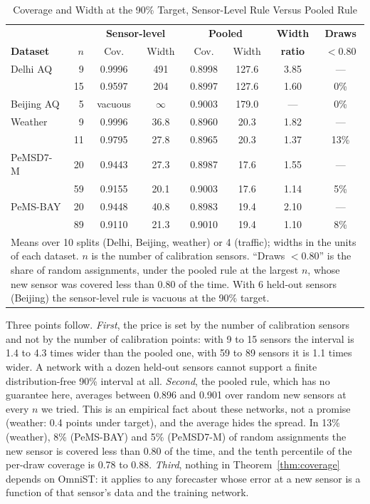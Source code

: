 \documentclass[journal,twoside,web]{ieeecolor}
\begin{document}
\begin{table}[htbp]
\caption{Coverage and Width at the 90\% Target, Sensor-Level Rule Versus Pooled Rule}
\label{tab:bound}
\centering
\footnotesize
\setlength{\tabcolsep}{3pt}
\begin{tabular}{lrcccccc}
\toprule
 & & \multicolumn{2}{c}{\textbf{Sensor-level}} & \multicolumn{2}{c}{\textbf{Pooled}} & \textbf{Width} & \textbf{Draws} \\
\textbf{Dataset} & $n$ & Cov. & Width & Cov. & Width & \textbf{ratio} & \textbf{$<0.80$} \\
\midrule
Delhi AQ   &  9 & 0.9996 & 491 & 0.8998 & 127.6 & 3.85 & --- \\
           & 15 & 0.9597 & 204 & 0.8997 & 127.6 & 1.60 & 0\% \\
Beijing AQ &  5 & vacuous & $\infty$ & 0.9003 & 179.0 & --- & 0\% \\
Weather    &  9 & 0.9996 & 36.8 & 0.8960 & 20.3 & 1.82 & --- \\
           & 11 & 0.9795 & 27.8 & 0.8965 & 20.3 & 1.37 & 13\% \\
PeMSD7-M   & 20 & 0.9443 & 27.3 & 0.8987 & 17.6 & 1.55 & --- \\
           & 59 & 0.9155 & 20.1 & 0.9003 & 17.6 & 1.14 & 5\% \\
PeMS-BAY   & 20 & 0.9448 & 40.8 & 0.8983 & 19.4 & 2.10 & --- \\
           & 89 & 0.9110 & 21.3 & 0.9010 & 19.4 & 1.10 & 8\% \\
\bottomrule
\multicolumn{8}{p{0.93\columnwidth}}{\footnotesize Means over 10 splits (Delhi, Beijing, weather) or 4
(traffic); widths in the units of each dataset. $n$ is the number of calibration sensors. ``Draws
$<0.80$'' is the share of random assignments, under the pooled rule at the largest $n$, whose new
sensor was covered less than 0.80 of the time. With 6 held-out sensors (Beijing) the sensor-level rule
is vacuous at the 90\% target.} \\
\end{tabular}
\end{table}



Three points follow. \emph{First}, the price is set by the number of calibration sensors and not by
the number of calibration points: with 9 to 15 sensors the interval is 1.4 to 4.3 times wider than the
pooled one, with 59 to 89 sensors it is 1.1 times wider. A network with a dozen held-out sensors cannot
support a finite distribution-free 90\% interval at all. \emph{Second}, the pooled rule, which has no
guarantee here, averages between 0.896 and 0.901 over random new sensors at every $n$ we tried. This is an empirical fact about these networks, not a promise (weather: 0.4 points under target), and the average hides the spread. In 13\% (weather), 8\% (PeMS-BAY) and 5\% (PeMSD7-M) of random
assignments the new sensor is covered less than 0.80 of the time, and the tenth percentile of the per-draw
coverage is 0.78 to 0.88. \emph{Third}, nothing in Theorem~\ref{thm:coverage} depends on OmniST: it applies to
any forecaster whose error at a new sensor is a function of that sensor's data and the training network.
\end{document}

